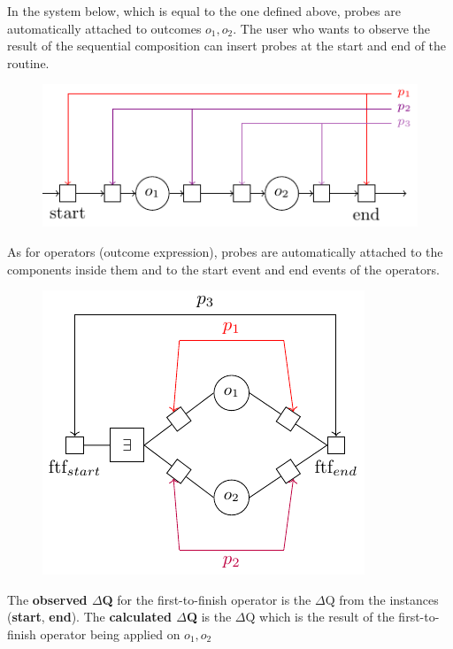         In the system below, which is equal to the one defined above, probes are automatically attached to outcomes $o_1, o_2$. The user who wants to observe the result of the sequential composition can insert probes at the start and end of the routine. 

        \begin{figure}[H]
            \begin{center}
                \includegraphics[scale=1.3]{tikz/probe_1.pdf}
            \end{center}
        \end{figure}
       
       As for operators (outcome expression), probes are automatically attached to the components inside them and to the start event and end events of the operators. 

       \begin{figure}[H]
           \begin{center}
                \includegraphics[scale = 1.3]{tikz/probe_2.pdf}
            \end{center}
        \end{figure}
    
    The \textbf{observed $\Delta$Q} for the first-to-finish operator is the $\Delta$Q from the instances (\textbf{start}, \textbf{end}). The \textbf{calculated $\Delta$Q} is the $\Delta$Q which is the result of the first-to-finish operator being applied on $o_1, o_2$

